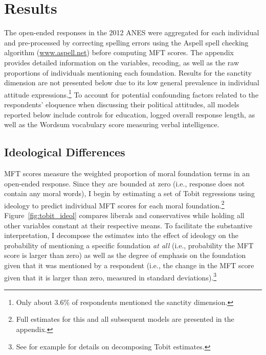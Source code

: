 \documentclass[12pt]{article}
\begin{document}
\section*{Results}

The open-ended responses in the 2012 ANES were aggregated for each individual and pre-processed by correcting spelling errors using the Aspell spell checking algorithm (\url{www.aspell.net}) before computing MFT scores. The appendix provides detailed information on the variables, recoding, as well as the raw proportions of individuals mentioning each foundation. Results for the sanctity dimension are not presented below due to its low general prevalence in individual attitude expressions.\footnote{Only about 3.6\% of respondents mentioned the sanctity dimension.} To account for potential confounding factors related to the respondents' eloquence when discussing their political attitudes, all models reported below include controls for education, logged overall response length, as well as the Wordsum vocabulary score measuring verbal intelligence.




\subsection*{Ideological Differences}

MFT scores measure the weighted proportion of moral foundation terms in an open-ended response. Since they are bounded at zero (i.e., response does not contain any moral words), I begin by estimating a set of Tobit regressions using ideology to predict individual MFT scores for each moral foundation.\footnote{Full estimates for this and all subsequent models are presented in the appendix.} Figure~\ref{fig:tobit_ideol} compares liberals and conservatives while holding all other variables constant at their respective means. To facilitate the substantive interpretation, I decompose the estimates into the effect of ideology on the probability of mentioning a specific foundation \textit{at all} (i.e., probability the MFT score is larger than zero) as well as the degree of emphasis on the foundation given that it was mentioned by a respondent (i.e., the change in the MFT score given that it is larger than zero, measured in standard deviations).\footnote{See for example \citet{mcdonald1980uses} for details on decomposing Tobit estimates.}
\end{document}

